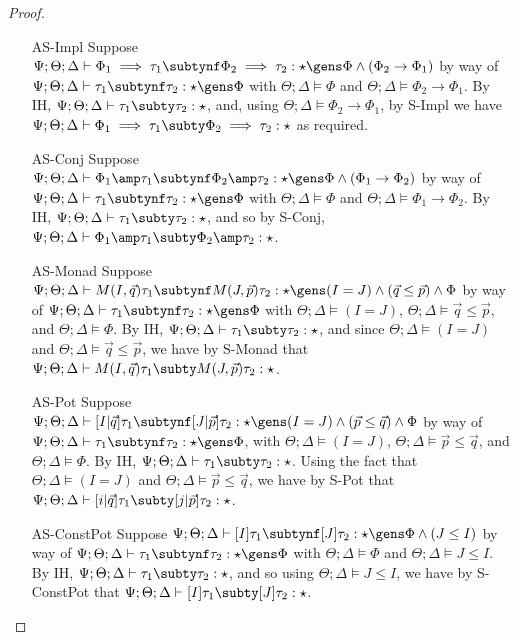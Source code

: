\begin{proof}
\begin{itemize}
  \item[AS-Impl] Suppose $\Psi ; \Theta ; \Delta \vdash \Phi_1 \implies \tau_1 \subtynf \Phi_2 \implies \tau_2 : \star \gens \Phi \wedge (\Phi_2 \to \Phi_1)$ by way of $\Psi ; \Theta ; \Delta \vdash \tau_1 \subtynf \tau_2 : \star \gens \Phi$ with $\Theta ; \Delta \vDash \Phi$ and $\Theta ; \Delta \vDash \Phi_2 \to \Phi_1$. By IH, $\Psi ; \Theta ; \Delta \vdash \tau_1 \subty \tau_2 : \star$, and, using $\Theta ; \Delta \vDash \Phi_2 \to \Phi_1$, by S-Impl we have $\Psi ; \Theta ; \Delta \vdash \Phi_1 \implies \tau_1 \subty \Phi_2 \implies \tau_2 : \star$ as required.
  \item[AS-Conj] Suppose $\Psi ; \Theta ; \Delta \vdash \Phi_1 \amp \tau_1 \subtynf \Phi_2 \amp \tau_2 : \star \gens \Phi \wedge (\Phi_1 \to \Phi_2)$ by way of $\Psi ; \Theta ; \Delta \vdash \tau_1 \subtynf \tau_2 : \star \gens \Phi$ with $\Theta ; \Delta \vDash \Phi$ and $\Theta ; \Delta \vDash \Phi_1 \to \Phi_2$. By IH, $\Psi ; \Theta ; \Delta \vdash \tau_1 \subty \tau_2 : \star$, and so by S-Conj, $\Psi ; \Theta ; \Delta \vdash \Phi_1 \amp \tau_1 \subty \Phi_2 \amp \tau_2 : \star$.
  \item[AS-Monad] Suppose $\Psi ; \Theta ; \Delta \vdash M(I,\vec{q}) \tau_1 \subtynf M(J,\vec{p}) \tau_2 : \star \gens (I = J) \wedge (\vec{q} \leq \vec{p}) \wedge \Phi$ by way of $\Psi ; \Theta ; \Delta \vdash \tau_1 \subtynf \tau_2 : \star \gens \Phi$ with $\Theta ; \Delta \vDash (I = J)$,  $\Theta ; \Delta \vDash \vec{q} \leq \vec{p}$, and $\Theta ; \Delta \vDash \Phi$. By IH, $\Psi ; \Theta ; \Delta \vdash \tau_1 \subty \tau_2 : \star$, and since $\Theta ; \Delta \vDash (I = J)$ and $\Theta ; \Delta \vDash \vec{q} \leq \vec{p}$, we have by S-Monad that $\Psi ; \Theta ; \Delta \vdash M(I,\vec{q}) \tau_1 \subty M(J,\vec{p}) \tau_2 : \star$.
  \item[AS-Pot] Suppose $\Psi ; \Theta ; \Delta \vdash [I|\vec{q}] \tau_1 \subtynf [J|\vec{p}] \tau_2 : \star \gens (I = J) \wedge (\vec{p} \leq \vec{q}) \wedge \Phi$ by way of $\Psi ; \Theta ; \Delta \vdash \tau_1 \subtynf \tau_2 : \star \gens \Phi$, with  $\Theta ; \Delta \vDash (I = J)$,  $\Theta ; \Delta \vDash \vec{p} \leq \vec{q}$, and $\Theta ; \Delta \vDash \Phi$. By IH, $\Psi ; \Theta ; \Delta \vdash \tau_1 \subty \tau_2 : \star$. Using the fact that $\Theta ; \Delta \vDash (I = J)$ and $\Theta ; \Delta \vDash \vec{p} \leq \vec{q}$, we have by S-Pot that $\Psi ; \Theta ; \Delta \vdash [i|\vec{q}] \tau_1 \subty [j|\vec{p}] \tau_2 : \star$.
  \item[AS-ConstPot] Suppose ${\Psi ; \Theta ; \Delta \vdash [I] \tau_1 \subtynf [J] \tau_2 : \star \gens \Phi \wedge (J \leq I)}$ by way of ${\Psi ; \Theta ; \Delta \vdash \tau_1 \subtynf \tau_2 : \star \gens \Phi}$ with $\Theta ; \Delta \vDash \Phi$ and $\Theta ; \Delta \vDash J \leq I$. By IH, $\Psi ; \Theta ; \Delta \vdash \tau_1 \subty \tau_2 : \star$, and so using $\Theta ; \Delta \vDash J \leq I$, we have by S-ConstPot that $\Psi ; \Theta ; \Delta \vdash [I] \tau_1 \subty [J] \tau_2 : \star$.

\end{itemize}
\end{proof}
